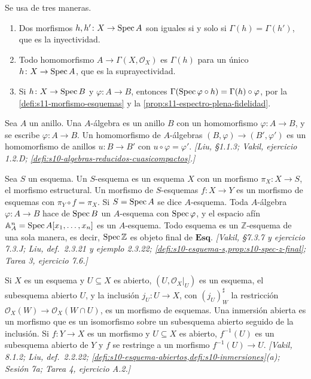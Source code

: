 \begin{obs}
\label{obs:s11-uso-teorema}
Se usa de tres maneras.
\begin{enumerate}[label=(\roman*)]
\item Dos morfismos \(h,h'\colon X\to\operatorname{Spec} A\) son iguales si y solo si \(\Gamma(h)=\Gamma(h')\), que es la inyectividad.
\item Todo homomorfismo \(A\to\Gamma(X,\mathcal O_X)\) es \(\Gamma(h)\) para un único \(h\colon X\to\operatorname{Spec} A\), que es la suprayectividad.
\item Si \(h\colon X\to\operatorname{Spec} B\) y \(\varphi\colon A\to B\), entonces \(\Gamma(\operatorname{Spec}\varphi\circ h)=\Gamma(h)\circ\varphi\), por la \cref{defi:s11-morfismo-esquemas} y la \cref{prop:s11-espectro-plena-fidelidad}.
\end{enumerate}
\end{obs}

\begin{defi}
\label{defi:s11-algebras}
Sea \(A\) un anillo. Una \(A\)-álgebra es un anillo \(B\) con un homomorfismo \(\varphi\colon A\to B\), y se escribe \(\varphi\colon A\to B\). Un homomorfismo de \(A\)-álgebras \((B,\varphi)\to(B',\varphi')\) es un homomorfismo de anillos \(u\colon B\to B'\) con \(u\circ\varphi=\varphi'\). \emph{[Liu, \S1.1.3; Vakil, ejercicio 1.2.D; \cref{defi:s10-algebras-reducidos-cuasicompactos}.]}
\end{defi}

\begin{defi}
\label{defi:s11-esquemas-base}
Sea \(S\) un esquema. Un \(S\)-esquema es un esquema \(X\) con un morfismo \(\pi_X\colon X\to S\), el morfismo estructural. Un morfismo de \(S\)-esquemas \(f\colon X\to Y\) es un morfismo de esquemas con \(\pi_Y\circ f=\pi_X\). Si \(S=\operatorname{Spec} A\) se dice \(A\)-esquema. Toda \(A\)-álgebra \(\varphi\colon A\to B\) hace de \(\operatorname{Spec} B\) un \(A\)-esquema con \(\operatorname{Spec}\varphi\), y el espacio afín \(\mathbb A_A^n=\operatorname{Spec} A[x_1,\ldots,x_n]\) es un \(A\)-esquema. Todo esquema es un \(\mathbb Z\)-esquema de una sola manera, es decir, \(\operatorname{Spec}\mathbb Z\) es objeto final de \(\mathbf{Esq}\). \emph{[Vakil, \S7.3.7 y ejercicio 7.3.J; Liu, def.~2.3.21 y ejemplo 2.3.22; \cref{defi:s10-esquema-s,prop:s10-spec-z-final}; Tarea 3, ejercicio 7.6.]}
\end{defi}

\begin{defi}
\label{defi:s11-subesquema-abierto}
Si \(X\) es un esquema y \(U\subseteq X\) es abierto, \((U,\mathcal O_X|_U)\) es un esquema, el subesquema abierto \(U\), y la inclusión \(j_U\colon U\to X\), con \((j_U)^\sharp_W\) la restricción \(\mathcal O_X(W)\to\mathcal O_X(W\cap U)\), es un morfismo de esquemas. Una inmersión abierta es un morfismo que es un isomorfismo sobre un subesquema abierto seguido de la inclusión. Si \(f\colon Y\to X\) es un morfismo y \(U\subseteq X\) es abierto, \(f^{-1}(U)\) es un subesquema abierto de \(Y\) y \(f\) se restringe a un morfismo \(f^{-1}(U)\to U\). \emph{[Vakil, 8.1.2; Liu, def.~2.2.22; \cref{defi:s10-esquema-abiertos,defi:s10-inmersiones}(a); Sesión 7a; Tarea 4, ejercicio A.2.]}
\end{defi}

